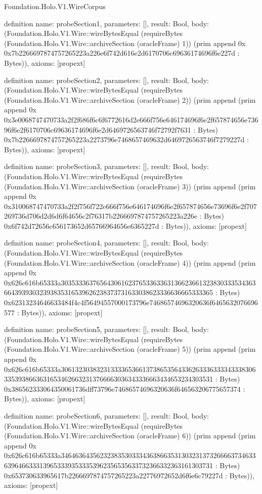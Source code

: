 \begin{lexlean}{Foundation.Holo.V1.WireCorpus}
\begin{semanticmodule}
definition{
  name: probeSection1,
  parameters: [],
  result: Bool,
  body: (Foundation.Holo.V1.Wire::wireBytesEqual (requireBytes (Foundation.Holo.V1.Wire::archiveSection (oracleFrame) 1)) (prim append 0x 0x7b2266697874757265223a226e6f742d616e2d6170706c69636174696f6e227d : Bytes)),
  axioms: [propext]
}

definition{
  name: probeSection2,
  parameters: [],
  result: Bool,
  body: (Foundation.Holo.V1.Wire::wireBytesEqual (requireBytes (Foundation.Holo.V1.Wire::archiveSection (oracleFrame) 2)) (prim append (prim append 0x 0x3e0068747470733a2f2f686f6c6f6772616d2e666f756e646174696f6e2f657874656e73696f6e2f6170706c69636174696f6e2d6469726563746f72792f7631 : Bytes) 0x7b2266697874757265223a2273796e7468657469632d6469726563746f7279227d : Bytes)),
  axioms: [propext]
}

definition{
  name: probeSection3,
  parameters: [],
  result: Bool,
  body: (Foundation.Holo.V1.Wire::wireBytesEqual (requireBytes (Foundation.Holo.V1.Wire::archiveSection (oracleFrame) 3)) (prim append (prim append 0x 0x310068747470733a2f2f756f722e666f756e646174696f6e2f657874656e73696f6e2f707269736d706d2d6d6f64656c2f76317b2266697874757265223a226e : Bytes) 0x6f742d72656c656173652d65766964656e6365227d : Bytes)),
  axioms: [propext]
}

definition{
  name: probeSection4,
  parameters: [],
  result: Bool,
  body: (Foundation.Holo.V1.Wire::wireBytesEqual (requireBytes (Foundation.Holo.V1.Wire::archiveSection (oracleFrame) 4)) (prim append (prim append 0x 0x626c616b65333a303533363765643061623765336336313662366132383033353436366439393032393835316539626238373731633038623336636665333365 : Bytes) 0x62313234646633484f4c4f56494557000173796e74686574696320636f6465632076696577 : Bytes)),
  axioms: [propext]
}

definition{
  name: probeSection5,
  parameters: [],
  result: Bool,
  body: (Foundation.Holo.V1.Wire::wireBytesEqual (requireBytes (Foundation.Holo.V1.Wire::archiveSection (oracleFrame) 5)) (prim append (prim append 0x 0x626c616b65333a306132303832313333653661373865356433626333633334333830633539386636316534626632313766663036343336663434653234303531 : Bytes) 0x386562333064350061736dff73796e74686574696320636f646563206775657374 : Bytes)),
  axioms: [propext]
}

definition{
  name: probeSection6,
  parameters: [],
  result: Bool,
  body: (Foundation.Holo.V1.Wire::wireBytesEqual (requireBytes (Foundation.Holo.V1.Wire::archiveSection (oracleFrame) 6)) (prim append (prim append 0x 0x626c616b65333a346463643562323835303334363866353130323137326666373463363964663331396533393533353962356535633732366332363161303731 : Bytes) 0x653730633965617b2266697874757265223a22776972652d6f6e6c79227d : Bytes)),
  axioms: [propext]
}


\end{semanticmodule}
\end{lexlean}
